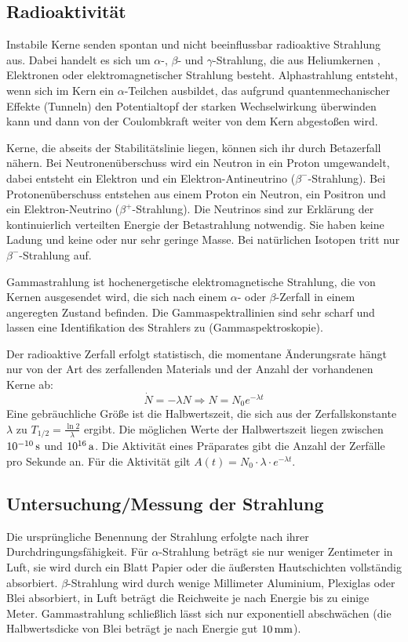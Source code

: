 \documentclass[a4paper]{scrartcl}
\begin{document}
\subsection{Radioaktivität}
Instabile Kerne senden spontan und nicht beeinflussbar radioaktive Strahlung aus. Dabei handelt es sich um $\alpha$-, $\beta$- und $\gamma$-Strahlung, die aus Heliumkernen , Elektronen oder elektromagnetischer Strahlung besteht. Alphastrahlung entsteht, wenn sich im Kern ein $\alpha$-Teilchen ausbildet, das aufgrund quantenmechanischer Effekte (Tunneln) den Potentialtopf der starken Wechselwirkung überwinden kann und dann von der Coulombkraft weiter von dem Kern abgestoßen wird.

Kerne, die abseits der Stabilitätslinie liegen, können sich ihr durch Betazerfall nähern. Bei Neutronenüberschuss wird ein Neutron in ein Proton umgewandelt, dabei entsteht ein Elektron und ein Elektron-Antineutrino ($\beta^{-}$-Strahlung). Bei Protonenüberschuss entstehen aus einem Proton ein Neutron, ein Positron und ein Elektron-Neutrino ($\beta^{+}$-Strahlung). Die Neutrinos sind zur Erklärung der kontinuierlich verteilten Energie der Betastrahlung notwendig. Sie haben keine Ladung und keine oder nur sehr geringe Masse. Bei natürlichen Isotopen tritt nur $\beta^{-}$-Strahlung auf.

Gammastrahlung ist hochenergetische elektromagnetische Strahlung, die von Kernen ausgesendet wird, die sich nach einem $\alpha$- oder $\beta$-Zerfall in einem angeregten Zustand befinden. Die Gammaspektrallinien sind sehr scharf und lassen eine Identifikation des Strahlers zu (Gammaspektroskopie).

Der radioaktive Zerfall erfolgt statistisch, die momentane Änderungsrate hängt nur von der Art des zerfallenden Materials und der Anzahl der vorhandenen Kerne ab:
\begin{equation*}
  \dot N = -\lambda N \Rightarrow N = N_0 e^{-\lambda t}
\end{equation*}
Eine gebräuchliche Größe ist die Halbwertszeit, die sich aus der Zerfallskonstante $\lambda$ zu $T_{1/2} = \frac{\ln 2}{\lambda}$ ergibt. Die möglichen Werte der Halbwertszeit liegen zwischen $\unit[10^{-10}]{s}$ und $\unit[10^{16}]{a}$. Die Aktivität eines Präparates gibt die Anzahl der Zerfälle pro Sekunde an. Für die Aktivität gilt $A(t) = N_0 \cdot \lambda \cdot e^{-\lambda t}$.

\subsection{Untersuchung/Messung der Strahlung}
Die ursprüngliche Benennung der Strahlung erfolgte nach ihrer Durchdringungsfähigkeit. Für $\alpha$-Strahlung beträgt sie nur weniger Zentimeter in Luft, sie wird durch ein Blatt Papier oder die äußersten Hautschichten vollständig absorbiert. $\beta$-Strahlung wird durch wenige Millimeter Aluminium, Plexiglas oder Blei absorbiert, in Luft beträgt die Reichweite je nach Energie bis zu einige Meter. Gammastrahlung schließlich lässt sich nur exponentiell abschwächen (die Halbwertsdicke von Blei beträgt je nach Energie gut $\unit[10]{mm}$).
\end{document}
